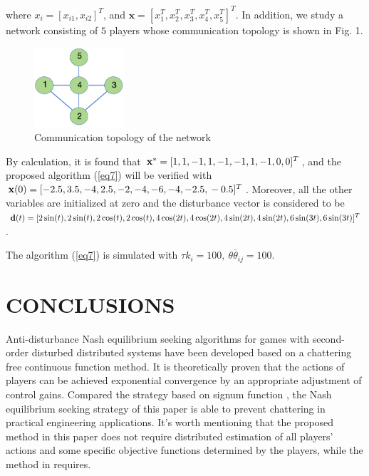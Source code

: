 \documentclass[lettersize,journal]{IEEEtran}
\begin{document}
where $x_i = [x_{i1}, x_{i2}]^T$, and $\mathbf{x}=[x_1^T,x_2^T,x_3^T,x_4^T,x_5^T]^T$. In addition, we study a network consisting of $5$ players whose communication topology is shown in Fig. 1.
\begin{figure}[htbp]
    \centering
    \includegraphics[width=0.3\textwidth]{img/fig1.png}
    \caption{Communication topology of the network}
\end{figure}

By calculation, it is found that $\mathbf{x}^* = [1,1,-1,1,-1,-1,\\1,-1,0,0]^T$, and the proposed algorithm (\ref{eq7}) will be verified with $\mathbf{x}(0) = [-2.5,3.5,-4,2.5,-2,-4,-6,-4,-2.5,\\-0.5]^T$. Moreover, all the other variables are initialized at zero and the disturbance vector is considered to be $\mathbf{d}(t)=[2\sin(t),2\sin(t),2\cos(t),2\cos(t),4\cos(2t),4\cos(2t),\\4\sin(2t),4\sin(2t),6\sin(3t),6\sin(3t)]^T$.

The algorithm (\ref{eq7}) is simulated with $\tau k_i = 100,~\theta\overline{\theta}_{ij}=100$.
\section{CONCLUSIONS}
Anti-disturbance Nash equilibrium seeking algorithms for games with second-order disturbed distributed systems have been developed based on a chattering free continuous function method. It is theoretically proven that the actions of players can be achieved exponential convergence by an appropriate adjustment of control gains. Compared the strategy based on signum function \cite{9696299}, the Nash equilibrium seeking strategy of this paper is able to prevent chattering in practical engineering applications. It's worth mentioning that the proposed method in this paper does not require distributed estimation of all players' actions and some specific objective functions determined by the players, while the method in \cite{8985536} requires.



\end{document}
